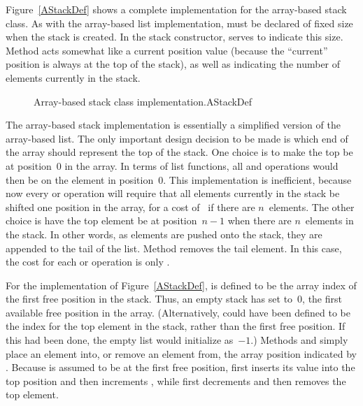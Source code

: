 Figure~\ref{AStackDef} shows a complete implementation for
the array-based stack class.
As with the array-based list implementation,
 must be declared of fixed size when the stack is
created.
In the stack constructor,  serves
to indicate this size.
Method  acts somewhat like a current
position value (because the ``current'' position is always at the top
of the stack), as well as indicating the number of elements
currently in the stack.


\begin{figure}
\vspace{-\bigskipamount}\vspace{-\smallskipamount}
{Array-based stack class implementation.}{AStackDef}
\vspace{-\smallskipamount}
\end{figure}

The array-based stack implementation is essentially
a simplified version of the array-based list.
The only important design decision to be made is which end of the
array should represent the top of the stack.
One choice is to make the top be at position~0 in the array.
In terms of list functions, all  and 
operations would then be on the element in position~0.
This implementation is inefficient, because now every
 or 
operation will require that all elements currently in the stack be
shifted one position in the array, for a cost of \Thetan\ if there
are $n$~elements.
The other choice is have the top element be at position~$n-1$ when
there are $n$~elements in the stack.
In other words, as elements are pushed onto the stack, they are
appended to the tail of the list.
Method  removes the tail element.
In this case, the cost for each  or  operation
is only \Thetaone.

For the implementation of Figure~\ref{AStackDef},
 is defined to be the array index of the
first free position in the stack.
Thus, an empty stack has  set to~0, the first available
free position in the array.
(Alternatively,  could have been defined to be
the index for the top element in the stack, rather than the
first free position.
If this had been done, the empty list would initialize 
as~$-1$.)
Methods  and 
simply place an element into, or remove an element from, the array
position indicated by .
Because  is assumed to be at the first free position,
 first inserts its value into the top position and then
increments , while  first decrements 
and then removes the top element.

